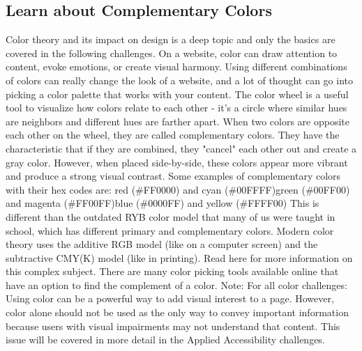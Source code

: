 \documentclass{article}%
\begin{document}
\subsection{Learn about Complementary Colors}%
\label{subsec:LearnaboutComplementaryColors}%
Color theory and its impact on design is a deep topic and only the basics are covered in the following challenges. On a website, color can draw attention to content, evoke emotions, or create visual harmony. Using different combinations of colors can really change the look of a website, and a lot of thought can go into picking a color palette that works with your content.\newline%
The color wheel is a useful tool to visualize how colors relate to each other {-} it's a circle where similar hues are neighbors and different hues are farther apart. When two colors are opposite each other on the wheel, they are called complementary colors. They have the characteristic that if they are combined, they "cancel" each other out and create a gray color. However, when placed side{-}by{-}side, these colors appear more vibrant and produce a strong visual contrast.\newline%
Some examples of complementary colors with their hex codes are:\newline%
red (\#FF0000) and cyan (\#00FFFF)green (\#00FF00) and magenta (\#FF00FF)blue (\#0000FF) and yellow (\#FFFF00)\newline%
This is different than the outdated RYB color model that many of us were taught in school, which has different primary and complementary colors. Modern color theory uses the additive RGB model (like on a computer screen) and the subtractive CMY(K) model (like in printing). Read here for more information on this complex subject.\newline%
There are many color picking tools available online that have an option to find the complement of a color.\newline%
Note: For all color challenges: Using color can be a powerful way to add visual interest to a page. However, color alone should not be used as the only way to convey important information because users with visual impairments may not understand that content. This issue will be covered in more detail in the Applied Accessibility challenges.\newline%

%
\end{document}
